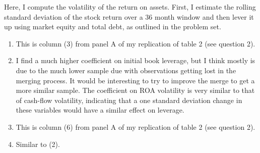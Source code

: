 \documentclass{article}
\begin{document}
Here, I compute the volatility of the return on assets.  First, I estimate the rolling standard deviation of the stock return over a 36 month window and then lever it up using market equity and total debt, as outlined in the problem set.

\begin{enumerate}

\item This is column (3) from panel A of my replication of table 2 (see question 2).

\item I find a much higher coefficient on initial book leverage, but I think mostly is due to the much lower sample due with observations getting lost in the merging process.  It would be interesting to try to improve the merge to get a more similar sample.  The coefficient on ROA volatility is very similar to that of cash-flow volatility, indicating that a one standard deviation change in these variables would have a similar effect on leverage.

\item This is column (6) from panel A of my replication of table 2 (see question 2).

\item Similar to (2).

\end{enumerate}

\bigskip


\end{document}
